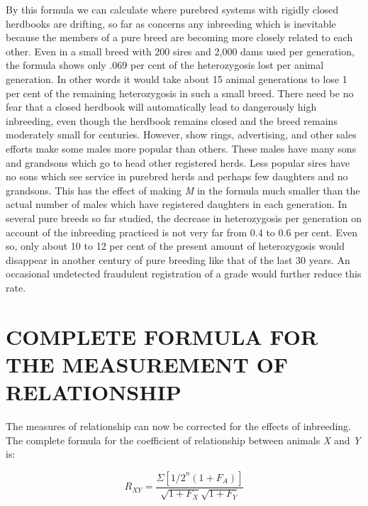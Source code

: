 By this formula we can calculate where purebred systems with rigidly
closed herdbooks are drifting, so far as concerns any inbreeding
which is inevitable because the members of a pure breed are becoming
more closely related to each other. Even in a small breed with 200 sires
and 2,000 dams used per generation, the formula shows only .069 per
cent of the heterozygosis lost per animal generation. In other words it
would take about 15 animal generations to lose 1 per cent of the remaining
heterozygosis in such a small breed. There need be no fear that a
closed herdbook will automatically lead to dangerously high inbreeding,
even though the herdbook remains closed and the breed remains
moderately small for centuries. However, show rings, advertising, and
other sales efforts make some males more popular than others. These
males have many sons and grandsons which go to head other registered
herds. Less popular sires have no sons which see service in purebred
herds and perhaps few daughters and no grandsons. This has the effect
of making \textit{M }in the formula much smaller than the actual number of
males which have registered daughters in each generation. In several
pure breeds so far studied, the decrease in heterozygosis per generation
on account of the inbreeding practiced is not very far from 0.4 to 0.6 per
cent. Even so, only about 10 to 12 per cent of the present amount of
heterozygosis would disappear in another century of pure breeding like
that of the last 30 years. An occasional undetected fraudulent registration
of a grade would further reduce this rate.

\section*{COMPLETE FORMULA FOR THE MEASUREMENT OF RELATIONSHIP}

The measures of relationship can now be corrected for the effects of
inbreeding. The complete formula for the coefficient of relationship
between animals \textit{X} and \textit{Y} is:

\[R_{XY} = \frac{\Sigma[{1/2}^n(1 + F_A)]}{\sqrt{1 + F_X}\sqrt{1 + F_Y}} \]

